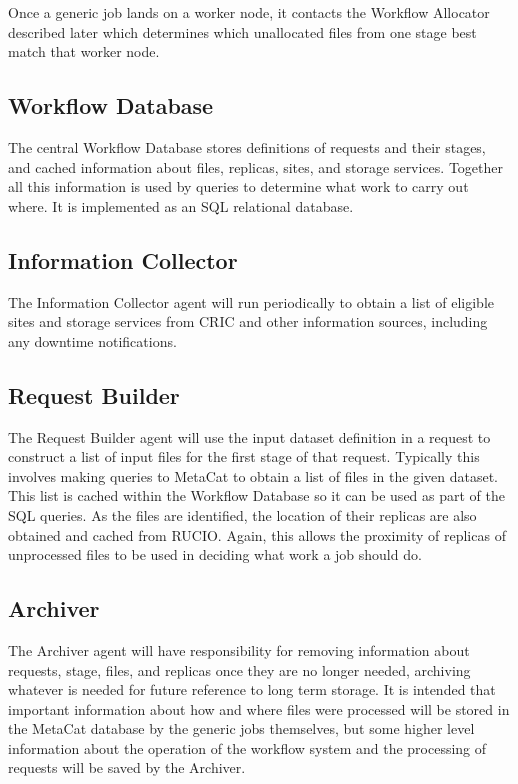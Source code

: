\documentclass[../main-v1.tex]{subfiles}
\begin{document}
Once a generic job lands on a worker node, it contacts the Workflow Allocator described later which determines which unallocated files from one stage best match that worker node.

\subsection{Workflow Database }
\label{sec:flow:wfdb}

The central Workflow Database stores definitions of requests and their stages, and cached information about files, replicas, sites, and storage services. Together all this information is used by queries to determine what work to carry out where. It is implemented as an SQL relational database.

\subsection{Information Collector}
\label{sec:flow:collector}

The Information Collector agent will run periodically to obtain a list of eligible sites and storage services from CRIC and other information sources, including any downtime notifications. 

\subsection{Request Builder}
\label{sec:flow:builder}

The Request Builder agent will use the input dataset definition in a request to construct a list of input files for the first stage of that request. Typically this involves making queries to MetaCat to obtain a list of files in the given dataset. This list is cached within the Workflow Database so it can be used as part of the SQL queries. As the files are identified, the location of their replicas are also obtained and cached from RUCIO. Again, this allows the proximity of replicas of unprocessed files to be used in deciding what work a job should do.

\subsection{Archiver}
\label{sec:flow:archiver}

The Archiver agent will have responsibility for removing information about requests, stage, files, and replicas once they are no longer needed, archiving whatever is needed for future reference to long term storage. It is intended that important information about how and where files were processed will be stored in the MetaCat database by the generic jobs themselves, but some higher level information about the operation of the workflow system and the processing of requests will be saved by the Archiver.
\end{document}
